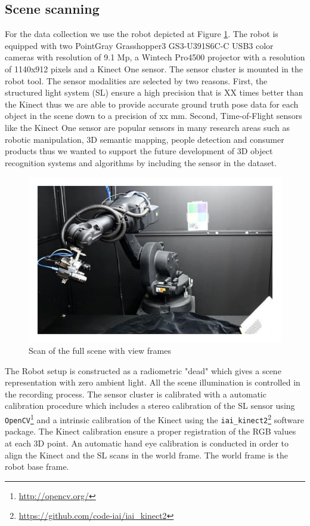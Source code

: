 \documentclass[10pt,twocolumn,letterpaper]{article}
\begin{document}
\subsection{Scene scanning} 
For the data collection we use the robot depicted at Figure \ref{fig:robot}. The robot is equipped with two PointGray Grasshopper3 GS3-U391S6C-C USB3 color cameras with resolution of 9.1 Mp, a Wintech Pro4500 projector with a resolution of 1140x912 pixels and a Kinect One sensor. The sensor cluster is mounted in the robot tool. The sensor modalities are selected by two reasons. First, the structured light system (SL) ensure a high precision that is XX times better than the Kinect thus we are able to provide accurate ground truth pose data for each object in the scene down to a precision of xx mm. Second, Time-of-Flight sensors like the Kinect One sensor are popular sensors in many research areas such as robotic manipulation, 3D semantic mapping, people detection and consumer products thus we wanted to support the future development of 3D object recognition systems and algorithms by including the sensor in the dataset. 
\begin{figure}[ht]
\centering
\includegraphics[width=1.0\linewidth, height= 0.7\linewidth]{Robot.pdf}
\caption{Scan of the full scene with view frames}
\label{fig:robot}
\end{figure}
The Robot setup is constructed as a radiometric "dead" which gives a scene representation with zero ambient light. All the scene illumination is controlled in the recording process. The sensor cluster is calibrated with a automatic calibration procedure which includes a stereo calibration of the SL sensor using \verb|OpenCV|\footnote{\url{http://opencv.org/}} and a intrinsic calibration of the Kinect using the \verb|iai_kinect2|\footnote{\url{https://github.com/code-iai/iai_kinect2}} software package. The Kinect calibration ensure a proper registration of the RGB values at each 3D point. An automatic hand eye calibration \cite{DornaikaHoraud1998} is conducted in order to align the Kinect and the SL scans in the world frame. The world frame is the robot base frame.
\end{document}
